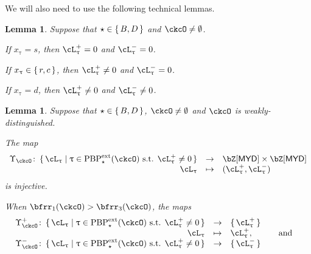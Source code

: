 \documentclass[12pt,a4paper]{amsart}
\newcommand{\pr}{\mathrm{pr}}
\def\MYD{{\mathsf{MYD}}}
\numberwithin{equation}{section}
\newtheorem{lem}[thm]{Lemma}
\theoremstyle{remark}
\def\PBPes{\mathrm{PBP}^{\mathrm{ext}}_{\star}}
\def\pUpsilon{\Upsilon^+}
\def\nUpsilon{\Upsilon^-}
\begin{document}
\smallskip

We will also need to use the following technical lemmas.
\begin{lem}\label{lem:BD2}
Suppose that $\star \in \set{B,D}$ and $\ckcO \neq \emptyset$.
\begin{enuma}
  \item If $x_{\uptau}=s$, then $\ac_{\uptau}^{+} =0$ and $\ac_{\uptau}^{-}=0$.
  \item If $x_{\uptau}\in \set{r,c}$, then $\ac_{\uptau}^{+} \neq 0$ and $\ac_{\uptau}^{-}=0$.
  \item If $x_{\uptau}=d$, then $\ac_{\uptau}^{+} \neq 0$ and
  $\ac_{\uptau}^{-}\neq 0$.
\end{enuma}
\end{lem}

\begin{lem}\label{lem:BD3}
Suppose that $\star \in \set{B,D}$, $\ckcO \neq \emptyset$ and $\ckcO$ is weakly-distinguished.
\begin{enuma}
    \item The map
    \begin{equation}\label{eq:up}
      \begin{array}{rcl}
        \Upsilon_{\ckcO} \colon \set{\ac_{\uptau}|\uptau\in \PBPes(\ckcO)
        \text{ s.t. } \pac{\uptau}\neq 0 }
        & \rightarrow &  \bZ[\MYD]\times \bZ[\MYD] \\ %
        \ac_{\uptau} &\mapsto & (\pac{\uptau},\nac{\uptau})
      \end{array}
    \end{equation}
    is injective.
  \item When $\bfrr_{1}(\ckcO)> \bfrr_{3}(\ckcO)$, the maps
    \[
      \begin{array}{rcl}
        \pUpsilon_{\ckcO} \colon \set{\ac_{\uptau}|\uptau\in \PBPes(\ckcO)
        \text{ s.t. } \pac{\uptau}\neq 0 } &\rightarrow  & \set{\pac{\uptau}}\\
       \ac_{\uptau} & \mapsto & \pac{\uptau},\qquad \AND\\
        \nUpsilon_{\ckcO} \colon \set{\ac_{\uptau}|\uptau\in \PBPes(\ckcO)
        \text{ s.t. } \pac{\uptau}\neq 0} &\rightarrow & \set{\nac{\uptau}}\\

\end{array}\]
\end{enuma}
\end{lem}
\end{document}
